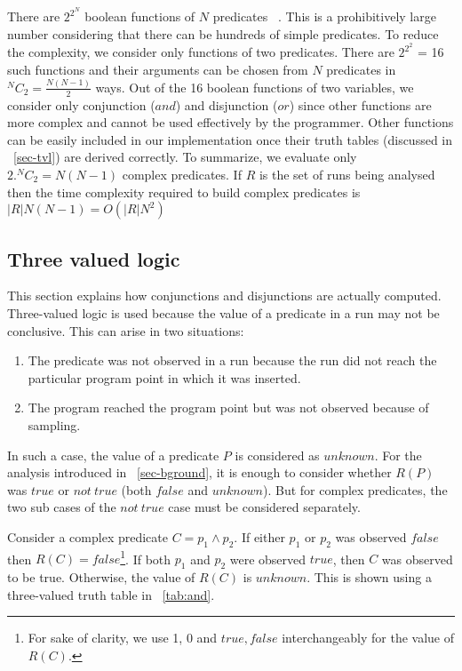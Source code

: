 There are $2^{2^N}$ boolean functions of $N$ predicates ~\cite{MathWorld:BoolFuncs}.  This is a prohibitively large number considering that there can be hundreds of simple predicates.  To reduce the complexity, we consider only functions of two predicates.  There are $2^{2^2}$ = 16 such functions and their arguments can be chosen from $N$ predicates in $^NC_2 = \frac{N(N-1)}{2}$ ways.  Out of the 16 boolean functions of two variables, we consider only conjunction ($and$) and disjunction ($or$) since other functions are more complex and cannot be used effectively by the programmer.  Other functions can be easily included in our implementation once their truth tables (discussed in ~\autoref{sec-tvl}) are derived correctly.  To summarize, we evaluate only $2. ^NC_2 = N(N-1)$ complex predicates.  If $R$ is the set of runs being analysed then the time complexity required to build complex predicates is $|R|N(N-1) = O(|R|N^2)$

\subsection{Three valued logic}
\label{sec-tvl}
This section explains how conjunctions and disjunctions are actually computed.  Three-valued logic is used because the value of a predicate in a run may not be conclusive. This can arise in two situations:
\begin{enumerate}
\item The predicate was not observed in a run because the run did not reach the particular program point in which it was inserted.
\item The program reached the program point but was not observed because of sampling.
\end{enumerate}

In such a case, the value of a predicate $P$ is considered as $unknown$.  For the analysis introduced in ~\ref{sec-bground}, it is enough to consider whether $R(P)$ was $true$ or $not\ true$ (both $false$ and $unknown$).  But for complex predicates, the two sub cases of the $not\ true$ case must be considered separately.

Consider a complex predicate $C = p_1 \wedge p_2$.  If either $p_1$ or $p_2$ was observed $false$ then $R(C) = false${\footnote{For sake of clarity, we use 1, 0 and $true, false$ interchangeably for the value of $R(C)$.}}.  If both $p_1$ and $p_2$ were observed $true$, then $C$ was observed to be true.  Otherwise, the value of $R(C)$ is $unknown$.  This is shown using a three-valued truth table in ~\autoref{tab:and}.

